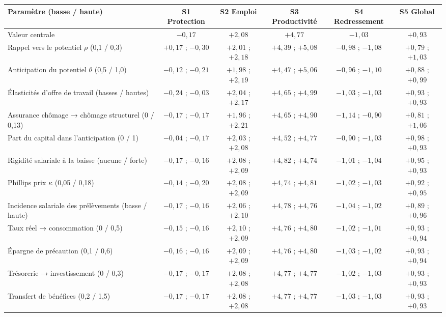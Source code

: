 \begin{tabular}{lccccc}\toprule
Paramètre (basse / haute) & S1 Protection & S2 Emploi & S3 Productivité & S4 Redressement & S5 Global \\ \midrule
Valeur centrale & $-0{,}17$ & $+2{,}08$ & $+4{,}77$ & $-1{,}03$ & $+0{,}93$ \\ \midrule
Rappel vers le potentiel $\rho$ (0,1 / 0,3) & $+0{,}17$ ; $-0{,}30$ & $+2{,}01$ ; $+2{,}18$ & $+4{,}39$ ; $+5{,}08$ & $-0{,}98$ ; $-1{,}08$ & $+0{,}79$ ; $+1{,}03$ \\
Anticipation du potentiel $\theta$ (0,5 / 1,0) & $-0{,}12$ ; $-0{,}21$ & $+1{,}98$ ; $+2{,}19$ & $+4{,}47$ ; $+5{,}06$ & $-0{,}96$ ; $-1{,}10$ & $+0{,}88$ ; $+0{,}99$ \\
Élasticités d'offre de travail (basses / hautes) & $-0{,}24$ ; $-0{,}03$ & $+2{,}04$ ; $+2{,}17$ & $+4{,}65$ ; $+4{,}99$ & $-1{,}03$ ; $-1{,}03$ & $+0{,}93$ ; $+0{,}93$ \\
Assurance chômage → chômage structurel (0 / 0,13) & $-0{,}17$ ; $-0{,}17$ & $+1{,}96$ ; $+2{,}21$ & $+4{,}65$ ; $+4{,}90$ & $-1{,}14$ ; $-0{,}90$ & $+0{,}81$ ; $+1{,}06$ \\
Part du capital dans l'anticipation (0 / 1) & $-0{,}04$ ; $-0{,}17$ & $+2{,}03$ ; $+2{,}08$ & $+4{,}52$ ; $+4{,}77$ & $-0{,}90$ ; $-1{,}03$ & $+0{,}98$ ; $+0{,}93$ \\
Rigidité salariale à la baisse (aucune / forte) & $-0{,}17$ ; $-0{,}16$ & $+2{,}08$ ; $+2{,}09$ & $+4{,}82$ ; $+4{,}74$ & $-1{,}01$ ; $-1{,}04$ & $+0{,}95$ ; $+0{,}93$ \\
Phillips prix $\kappa$ (0,05 / 0,18) & $-0{,}14$ ; $-0{,}20$ & $+2{,}08$ ; $+2{,}09$ & $+4{,}74$ ; $+4{,}81$ & $-1{,}02$ ; $-1{,}03$ & $+0{,}92$ ; $+0{,}95$ \\
Incidence salariale des prélèvements (basse / haute) & $-0{,}17$ ; $-0{,}16$ & $+2{,}06$ ; $+2{,}10$ & $+4{,}78$ ; $+4{,}76$ & $-1{,}04$ ; $-1{,}02$ & $+0{,}89$ ; $+0{,}96$ \\
Taux réel → consommation (0 / 0,5) & $-0{,}15$ ; $-0{,}16$ & $+2{,}10$ ; $+2{,}09$ & $+4{,}76$ ; $+4{,}80$ & $-1{,}02$ ; $-1{,}01$ & $+0{,}93$ ; $+0{,}94$ \\
Épargne de précaution (0,1 / 0,6) & $-0{,}16$ ; $-0{,}16$ & $+2{,}09$ ; $+2{,}09$ & $+4{,}76$ ; $+4{,}80$ & $-1{,}03$ ; $-1{,}02$ & $+0{,}93$ ; $+0{,}94$ \\
Trésorerie → investissement (0 / 0,3) & $-0{,}17$ ; $-0{,}17$ & $+2{,}08$ ; $+2{,}08$ & $+4{,}77$ ; $+4{,}77$ & $-1{,}02$ ; $-1{,}03$ & $+0{,}93$ ; $+0{,}93$ \\
Transfert de bénéfices (0,2 / 1,5) & $-0{,}17$ ; $-0{,}17$ & $+2{,}08$ ; $+2{,}08$ & $+4{,}77$ ; $+4{,}77$ & $-1{,}03$ ; $-1{,}03$ & $+0{,}93$ ; $+0{,}93$ \\
\bottomrule\end{tabular}
